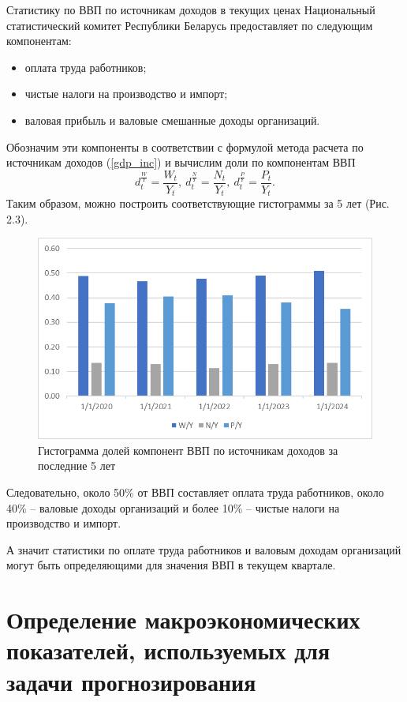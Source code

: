 \documentclass[a4paper, 14pt]{extreport}
\numberwithin{equation}{section}
\numberwithin{equation}{section}
\begin{document}
	Статистику по ВВП по источникам доходов в текущих ценах Национальный статистический комитет Республики Беларусь предоставляет по следующим компонентам:
	\begin{itemize}
		\item оплата труда работников;
		\item чистые налоги на производство и импорт;
		\item валовая прибыль и валовые смешанные доходы организаций.
	\end{itemize}
	Обозначим эти компоненты в соответствии с формулой метода расчета по источникам доходов (\ref{gdp_inc}) и вычислим доли по компонентам ВВП 
	\begin{equation}
		d^{\frac WY}_t = \dfrac{W_t}{Y_t},\ d^{\frac NY}_t = \dfrac{N_t}{Y_t},\ d^{\frac PY}_t = \dfrac{P_t}{Y_t}.
	\end{equation}
	Таким образом, можно построить соответствующие гистограммы за 5 лет (Рис. 2.3).
	\begin{figure}[h]\label{pic2.3}
		\centering
		\includegraphics[scale=1]{images/image03}
		\caption{Гистограмма долей компонент ВВП по источникам доходов за последние 5 лет}
		\label{fig:image03}
	\end{figure}
	
	Следовательно, около 50\% от ВВП составляет оплата труда работников, около 40\% -- валовые доходы организаций и более 10\% -- чистые налоги на производство и импорт.
	
	А значит статистики по оплате труда работников и валовым доходам организаций могут быть определяющими для значения ВВП в текущем квартале.
	
	\section{Определение макроэкономических показателей, используемых для задачи прогнозирования}
	\label{sec:ec-def}
	
\end{document}
